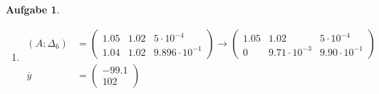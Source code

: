 \documentclass[11pt]{article}
\theoremstyle{break}
\newtheorem{task}{Aufgabe}
\begin{document}
\begin{task}
\begin{enumerate}[label={(\alph*)}]
\begin{align*}
\begin{pmatrix}
                0.99
            \end{pmatrix}\\
            \Delta_6 &= \begin{pmatrix}
                5\cdot 10^{-4}\\
                9.896\cdot 10^{-1}
            \end{pmatrix}
        \end{align*}
        \item \hfill\vspace{-5mm}
        \begin{align*}
            (A;\Delta_6) &= \left(\begin{array}{cc|c}
                1.05 & 1.02 & 5\cdot 10^{-4}\\
                1.04 & 1.02 & 9.896\cdot 10^{-1}
            \end{array}\right) \rightarrow \left(\begin{array}{cc|c}
                1.05 & 1.02 & 5\cdot 10^{-4}\\
                0 & 9.71\cdot 10^{-3} & 9.90\cdot 10^{-1}
            \end{array}\right)\\
            \overline{y} &= \begin{pmatrix}
                -99.1\\
                102
            \end{pmatrix}
        \end{align*}
    \end{enumerate}
\end{task}
\end{document}
